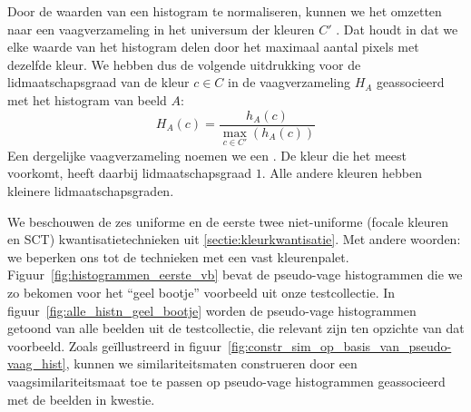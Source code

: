 Door de waarden van een histogram te normaliseren, kunnen we het omzetten naar 
een vaagverzameling in het universum der kleuren $C'$ 
\cite{debaets:similariteitsmaten_voor_kleurbeelden, vanderweken:similariteitsmaten, vertan:embedding_fuzzy_logic_in_cbir}. 
Dat houdt in dat we elke 
waarde van het histogram delen door het maximaal aantal pixels met dezelfde 
kleur. We hebben dus de volgende uitdrukking voor de lidmaatschapsgraad van de 
kleur $c \in C$ in de vaagverzameling $H_A$ geassocieerd met het histogram 
van beeld $A$: 
\begin{displaymath}
H_A(c) = \frac{\displaystyle h_A(c)}{\displaystyle \max_{c \in C'}(h_A(c))}
\end{displaymath}
Een dergelijke vaagverzameling noemen we een . 
De kleur die het meest voorkomt, heeft daarbij lidmaatschapsgraad $1$. Alle 
andere kleuren hebben kleinere lidmaatschapsgraden. 

We beschouwen de zes uniforme en de eerste twee niet-uniforme (focale kleuren en SCT) 
kwantisatietechnieken uit \ref{sectie:kleurkwantisatie}. 
Met andere woorden: we beperken ons tot de technieken met een vast kleurenpalet.
Figuur~\ref{fig:histogrammen_eerste_vb} bevat
de pseudo-vage histogrammen die we zo bekomen voor het ``geel bootje'' voorbeeld
uit onze testcollectie. In figuur~\ref{fig:alle_histn_geel_bootje} worden de pseudo-vage histogrammen
getoond van alle beelden uit de testcollectie, die relevant zijn ten opzichte van dat voorbeeld.
Zoals ge\"illustreerd in figuur~\ref{fig:constr_sim_op_basis_van_pseudo-vaag_hist}, kunnen we 
similariteitsmaten construeren door een vaagsimilariteitsmaat toe te passen op 
pseudo-vage histogrammen geassocieerd met de beelden in kwestie.

